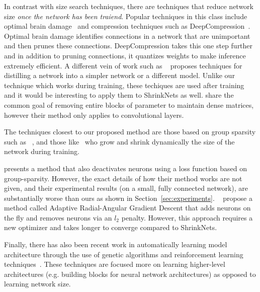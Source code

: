 In contrast with size search techniques, there are techniques that 
reduce network size {\it once the network has been traiend}.
Popular techniques in this class include optimal brain damage~\cite{Cun} and
compression techniques such as DeepCompression~\cite{han2015deepcompression}.
Optimal brain damage identifies connections in a network that are unimportant
and then prunes these connections.
DeepCompression takes this one step further and in addition to pruning connections,
it quantizes weights to make inference extremely efficient.
A different vein of work such as ~\cite{romero2014fitnets, hinton2015distilling}
proposes techniques for distilling a network into a simpler network or 
a different model.  Unlike our
technique which works during training, these techiques are used after training
and it would be interesting to apply them to ShrinkNets as well. 
\cite{Abadi2016b} share the common goal of removing entire blocks of parameter to maintain dense matrices, however their method only applies to convolutional layers.

The techniques closest to our proposed method are those based on group sparsity 
such as ~\cite{Scardapane2017}, and those like~\cite{Philipp} who grow and shrink
dynamically the size of the network during training.

\cite{Scardapane2017} presents a method that also deactivates neurons using a 
loss function based on group-sparsity.
However, the exact details of how their method works are not given, and 
their experimental results (on a small, fully connected network), 
are substantially worse than ours as shown in Section~\ref{sec:experiments}.
~\cite{Philipp} propose a method called Adaptive Radial-Angular Gradient Descent
that adds neurons on the fly and removes neurons via an $l_2$ penalty.
However, this approach requires a new optimizer and takes longer to converge 
compared to ShrinkNets.

Finally, there has also been recent work in automatically learning model
architecture through the use of genetic algorithms and reinforcement learning
techniques~\cite{DBLP:journals/corr/ZophL16, zoph2017learning}.  These
techniques are focused more on learning higher-level architectures (e.g.
building blocks for neural network architectures) as opposed to learning
network size.
